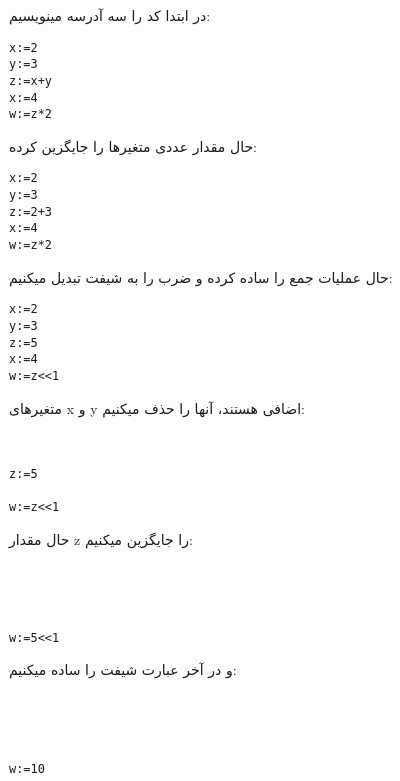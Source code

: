 در ابتدا کد را سه آدرسه مینویسیم:
\setLTR
\begin{lstlisting}
x:=2
y:=3
z:=x+y
x:=4
w:=z*2
\end{lstlisting}
\setRTL
حال مقدار عددی متغیرها را جایگزین کرده:
\setLTR
\begin{lstlisting}
x:=2
y:=3
z:=2+3
x:=4
w:=z*2
\end{lstlisting}
\setRTL
حال عملیات جمع را ساده کرده و ضرب را به شیفت تبدیل میکنیم:
\setLTR
\begin{lstlisting}
x:=2
y:=3
z:=5
x:=4
w:=z<<1
\end{lstlisting}
\setRTL
متغیرهای x و y اضافی هستند، آنها را حذف میکنیم:
\setLTR
\begin{lstlisting}


z:=5

w:=z<<1
\end{lstlisting}
\setRTL
حال مقدار z را جایگزین میکنیم:
\setLTR
\begin{lstlisting}




w:=5<<1
\end{lstlisting}
\setRTL
و در آخر عبارت شیفت را ساده میکنیم:
\setLTR
\begin{lstlisting}




w:=10
\end{lstlisting}
\setRTL